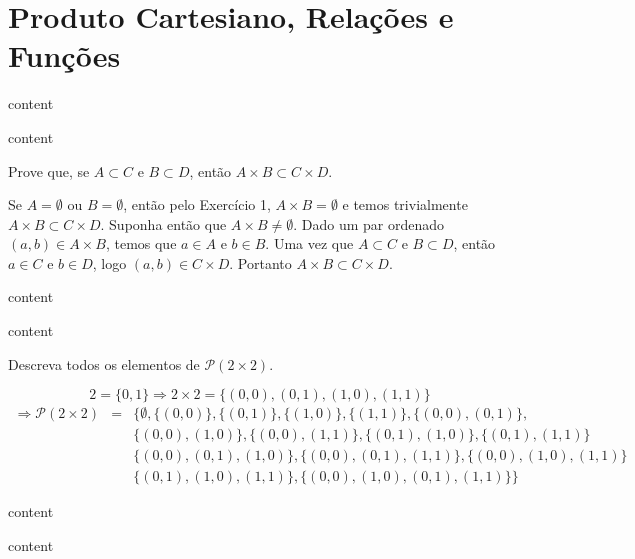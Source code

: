 \chapter{Produto Cartesiano, Relações e Funções}

\setcounter{ex}{0}

\begin{exercicio}
	content
\end{exercicio}
\begin{solucao}
	content
\end{solucao}

\begin{exercicio}
	Prove que, se $A\subset C$ e $B\subset D$, então $A\times B\subset C\times D$.
\end{exercicio}
\begin{solucao}
	Se $A=\emptyset$ ou $B=\emptyset$, então pelo Exercício 1, $A\times B=\emptyset$ e temos trivialmente $A\times B\subset C\times D$. Suponha então que $A\times B\neq\emptyset$. Dado um par ordenado $(a,b)\in A\times B$, temos que $a\in A$ e $b\in B$. Uma vez que $A\subset C$ e $B\subset D$, então $a\in C$ e $b\in D$, logo $(a,b)\in C\times D$. Portanto $A\times B\subset C\times D$.
\end{solucao}

\begin{exercicio}
	content
\end{exercicio}
\begin{solucao}
	content
\end{solucao}

\begin{exercicio}
	Descreva todos os elementos de $\mathcal{P}(2\times 2)$.
\end{exercicio}
\begin{solucao}
	$$2=\{0,1\}\Rightarrow 2\times2=\{(0,0),(0,1),(1,0),(1,1)\}$$
	\begin{eqnarray*}
		\Rightarrow\mathcal{P}(2\times 2)&=&\{\emptyset,\{(0,0)\},\{(0,1)\},\{(1,0)\},\{(1,1)\},\{(0,0),(0,1)\}, \\
		&&\{(0,0),(1,0)\},\{(0,0),(1,1)\},\{(0,1),(1,0)\},\{(0,1),(1,1)\} \\
		&&\{(0,0),(0,1),(1,0)\},\{(0,0),(0,1),(1,1)\},\{(0,0),(1,0),(1,1)\} \\
		&&\{(0,1),(1,0),(1,1)\},\{(0,0),(1,0),(0,1),(1,1)\}\}
	\end{eqnarray*}
\end{solucao}

\begin{exercicio}
	content
\end{exercicio}
\begin{solucao}
	content
\end{solucao}

